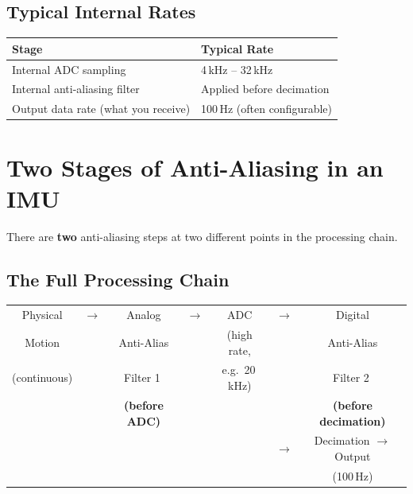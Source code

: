 \documentclass[12pt,a4paper]{article}
\begin{document}
\subsection{Typical Internal Rates}

\begin{center}
\begin{tabular}{ll}
    \toprule
    \textbf{Stage} & \textbf{Typical Rate} \\
    \midrule
    Internal ADC sampling & 4\,kHz -- 32\,kHz \\
    Internal anti-aliasing filter & Applied before decimation \\
    Output data rate (what you receive) & 100\,Hz (often configurable) \\
    \bottomrule
\end{tabular}
\end{center}

\section{Two Stages of Anti-Aliasing in an IMU}

There are \textbf{two} anti-aliasing steps at two different points in the processing chain.

\subsection{The Full Processing Chain}

\begin{center}
\small
\begin{tabular}{ccccccc}
    Physical & $\to$ & Analog & $\to$ & ADC & $\to$ & Digital \\
    Motion &        & Anti-Alias &     & (high rate, & & Anti-Alias \\
    (continuous) &  & Filter \textcircled{1} & & e.g.\ 20\,kHz) & & Filter \textcircled{2} \\
    & & \textbf{(before ADC)} & & & & \textbf{(before decimation)} \\[0.5em]
    & & & & & $\to$ & Decimation $\to$ Output \\
    & & & & & & (100\,Hz) \\
\end{tabular}
\end{center}
\end{document}
